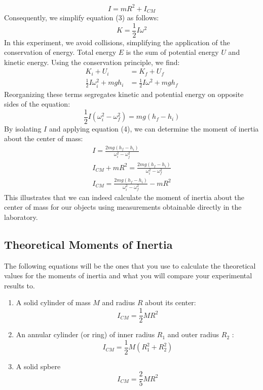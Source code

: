 \documentclass{report}
\begin{document}
    $$
    I = m R^2 + I_{CM}
    $$
    \bigbreak \noindent 
    Consequently, we simplify equation (3) as follows:
    $$
    K = \frac{1}{2} I \omega^2
    $$
    \bigbreak \noindent 
    In this experiment, we avoid collisions, simplifying the application of the conservation of energy. Total energy \(E\) is the sum of potential energy \(U\) and kinetic energy. Using the conservation principle, we find:
    $$
    \begin{aligned}
        K_i + U_i & = K_f + U_f \\
        \frac{1}{2} I \omega_i^2 + m g h_i & = \frac{1}{2} I \omega^2 + m g h_f
    \end{aligned}
    $$
    \bigbreak \noindent 
    Reorganizing these terms segregates kinetic and potential energy on opposite sides of the equation:
    $$
    \frac{1}{2} I(\omega_i^2 - \omega_f^2) = m g(h_f - h_i)
    $$
    \bigbreak \noindent 
    By isolating \(I\) and applying equation (4), we can determine the moment of inertia about the center of mass:
    $$
    \begin{gathered}
        I = \frac{2 m g(h_f - h_i)}{\omega_i^2 - \omega_j^2} \\
        I_{CM} + m R^2 = \frac{2 m g(h_f - h_i)}{\omega_i^2 - \omega_f^2} \\
        I_{CM} = \frac{2 m g(h_f - h_i)}{\omega_i^2 - \omega_f^2} - m R^2
    \end{gathered}
    $$
    \bigbreak \noindent 
    This illustrates that we can indeed calculate the moment of inertia about the center of mass for our objects using measurements obtainable directly in the laboratory.


    \bigbreak \noindent 
    \subsection{Theoretical Moments of Inertia}
    \bigbreak \noindent 
    The following equations will be the ones that you use to calculate the theoretical values for the moments of inertia and what you will compare your experimental results to.
    \begin{enumerate}
        \item A solid cylinder of mass $M$ and radius $R$ about its center:
        $$
        I_{C M}=\frac{1}{2} M R^2
        $$
        \item An annular cylinder (or ring) of inner radius $R_1$ and outer radius $R_2$ :
        $$
        I_{C M}=\frac{1}{2} M\left(R_1^2+R_2^2\right)
        $$
        \item A solid spbere
        $$
        I_{C M}=\frac{2}{5} M R^2
        $$
    \end{enumerate}
\end{document}
